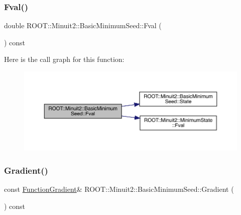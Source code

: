 \subsubsection{\texorpdfstring{Fval()}{Fval()}\hspace{0.1cm}{\footnotesize\ttfamily [2/2]}}
{\footnotesize\ttfamily double R\+O\+O\+T\+::\+Minuit2\+::\+Basic\+Minimum\+Seed\+::\+Fval (\begin{DoxyParamCaption}{ }\end{DoxyParamCaption}) const\hspace{0.3cm}{\ttfamily [inline]}}

Here is the call graph for this function\+:
\nopagebreak
\begin{figure}[H]
\begin{center}
\leavevmode
\includegraphics[width=350pt]{de/d50/classROOT_1_1Minuit2_1_1BasicMinimumSeed_a40b43b611717121256cd72bf40a3d5d7_cgraph}
\end{center}
\end{figure}
\mbox{\label{classROOT_1_1Minuit2_1_1BasicMinimumSeed_ab61377b63a177c93629ccb3e69e173db}} 
\subsubsection{\texorpdfstring{Gradient()}{Gradient()}\hspace{0.1cm}{\footnotesize\ttfamily [1/2]}}
{\footnotesize\ttfamily const \mbox{\hyperlink{classROOT_1_1Minuit2_1_1FunctionGradient}{Function\+Gradient}}\& R\+O\+O\+T\+::\+Minuit2\+::\+Basic\+Minimum\+Seed\+::\+Gradient (\begin{DoxyParamCaption}{ }\end{DoxyParamCaption}) const\hspace{0.3cm}{\ttfamily [inline]}}

